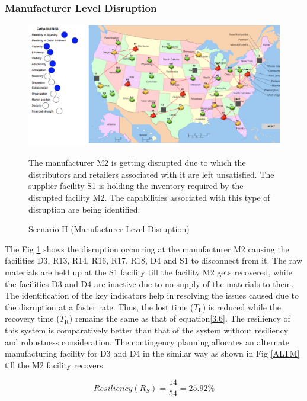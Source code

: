 \subsubsection{Manufacturer Level Disruption}

\begin{figure}[H]
  \centering
  \includegraphics[width=6.5in]{figures/pdf/S2MLD.png}\\
  \caption{Scenario II (Manufacturer Level Disruption)}
  {The manufacturer M2 is getting disrupted due to which the  distributors and retailers associated with it are left unsatisfied. The supplier facility S1 is holding the inventory required by the disrupted facility M2. The capabilities associated with this type of disruption are being identified.}
  \label{S2ML}
\end{figure}   

The Fig \ref{S2ML} shows the disruption occurring at the manufacturer M2 causing the facilities D3, R13, R14, R16, R17, R18, D4 and S1 to disconnect from it. The raw materials are held up at the S1 facility till the facility M2 gets recovered, while the facilities D3 and D4 are inactive due to no supply of the materials to them. The identification of the key indicators help in resolving the issues caused due to the disruption at a faster rate. Thus, the lost time ($T_{\text{L}}$) is reduced while the recovery time ($T_{\text{R}}$) remains the same as that of equation\ref{3.6}. The resiliency of this system is comparatively better than that of the system without resiliency and robustness consideration. The contingency planning allocates an alternate manufacturing facility for D3 and D4 in the similar way as shown in Fig \ref{ALTM} till the M2 facility recovers. 

\begin{equation}
    Resiliency(R_S) = \frac{14}{54} = 25.92 \% \label{3.21}
\end{equation}

